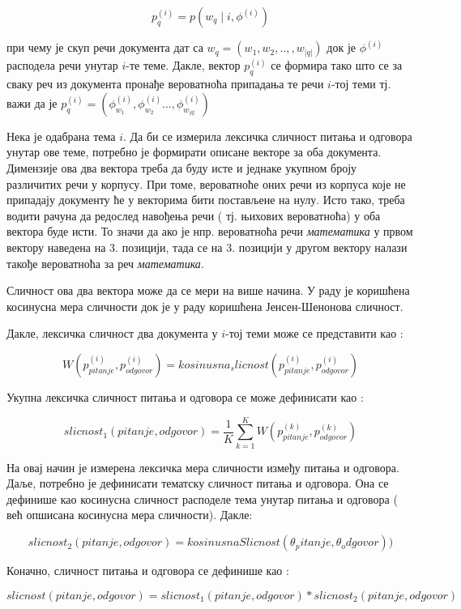 \begin{equation}
p_q^{(i)} = p(w_q \mid i,\phi^{(i)})
\end{equation}

при чему је скуп речи документа дат са  $w_q = (w_1,w_2,..,,w_{|q|})$ док је $\phi^{(i)}$ расподела речи унутар  $i$-те теме. 
Дакле, вектор $p_q^{(i)}$ се формира тако што се за сваку реч из документа пронађе вероватноћа припадања те речи  $i$-тој теми тј. важи да је 
$p_q^{(i)} = (\phi_{w_1}^{(i)},\phi_{w_2}^{(i)} ... ,\phi_{w_|q|}^{(i)})$

Нека је одабрана тема  $i$. Да би се измерила лексичка сличност питања и одговора унутар ове теме, потребно је формирати описане векторе за оба документа. Димензије ова два вектора треба да буду исте и једнаке укупном броју различитих речи у корпусу. При томе, вероватноће оних речи из корпуса које не припадају документу ће у  векторима бити постављене на нулу.  Исто тако, треба водити рачуна да редослед навођења речи ( тј. њихових вероватноћа) у оба вектора буде исти. То значи да ако је нпр. вероватноћа речи \textit{математика} у првом вектору наведена на 3. позицији, тада се на 3. позицији у другом вектору налази такође вероватноћа за реч \textit{математика}. 

Сличност ова два вектора може да се мери на више начина. У раду је коришћена косинусна мера сличности док је у раду \cite{tm2} коришћена Јенсен-Шенонова сличност.

Дакле, лексичка сличност два документа у $i$-тој теми може се представити као :

$$
W(p_{pitanje}^{(i)},p_{odgovor}^{(i)}) = kosinusna_slicnost(p_{pitanje}^{(i)},p_{odgovor}^{(i)})
$$

Укупна лексичка сличност питања и одговора се може дефинисати као :

$$
slicnost_1(pitanje,odgovor) = \frac{1}{K}\sum_{k=1}^K W(p_{pitanje}^{(k)},p_{odgovor}^{(k)})
$$


На овај начин је измерена лексичка мера сличности између питања и одговора. Даље, потребно је дефинисати тематску сличност питања и одговора. Она се дефинише као косинусна сличност расподеле тема унутар питања и одговора ( већ опшисана косинусна мера сличности). Дакле:

$$
slicnost_2(pitanje,odgovor) =kosinusnaSlicnost(\theta_pitanje,\theta_odgovor))
$$

Коначно, сличност питања и одговора се дефинише као :

$$
slicnost(pitanje,odgovor) = slicnost_1(pitanje,odgovor)*slicnost_2(pitanje,odgovor)
$$

